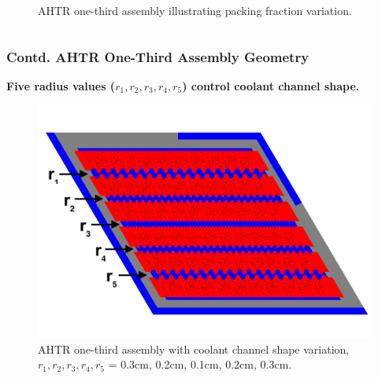\begin{frame}
\begin{columns}[t]
\begin{column}{0.5\textwidth}
\begin{figure}
{            \vspace{-0.6cm}
            \caption{AHTR one-third assembly illustrating packing fraction variation.}}
        \end{figure}
        \end{column}
        \begin{column}{0.5\textwidth} 
        \end{column}
        \end{columns}
\end{frame}

\begin{frame}
    \frametitle{Contd. AHTR One-Third Assembly Geometry}
    \textbf{Five radius values (\textbf{$r_1, r_2, r_3, r_4, r_5$}) 
    control coolant channel shape.}
    \begin{figure}
        \includegraphics[width=0.7\linewidth]{../docs/figures/coolant-channel-shape-assem.png} 
        \vspace{-0.3cm}
        \caption{AHTR one-third assembly with coolant channel shape variation, 
        $r_1, r_2, r_3, r_4, r_5$ = 0.3cm, 0.2cm, 0.1cm, 0.2cm, 0.3cm.}
    \end{figure}
\end{frame}

